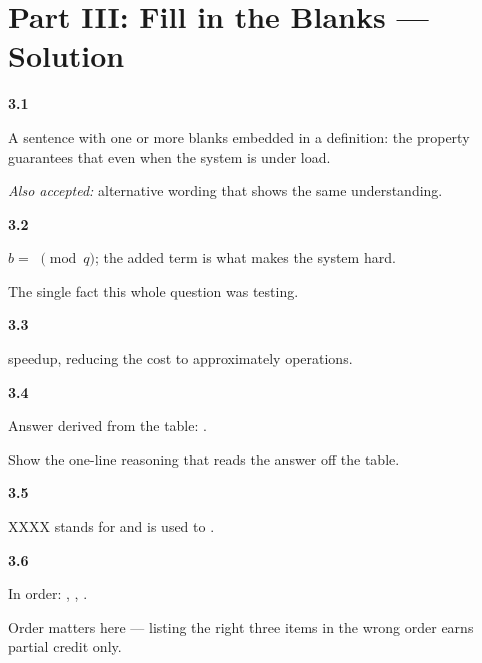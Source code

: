%

\section*{Part III: Fill in the Blanks --- Solution}

\textbf{3.1}
\begin{ans}
A sentence with one or more blanks embedded in a definition:
the  property guarantees that 
even when the system is under load.

\textit{Also accepted:} alternative wording that shows the same understanding.
\end{ans}

\textbf{3.2}
\begin{ans}
$b = $  $\pmod{q}$; the added term
 is what makes the system hard.
\end{ans}

\begin{keypoint}
The single fact this whole question was testing.
\end{keypoint}

\textbf{3.3}
\begin{ans}
 speedup, reducing the cost to approximately
 operations.
\end{ans}

\textbf{3.4}
\begin{ans}
Answer derived from the table: .

Show the one-line reasoning that reads the answer off the table.
\end{ans}

\textbf{3.5}
\begin{ans}
XXXX stands for  and is used to
.
\end{ans}

\textbf{3.6}
\begin{ans}
In order: , , .
\end{ans}

\begin{caution}
Order matters here --- listing the right three items in the wrong order
earns partial credit only.
\end{caution}
